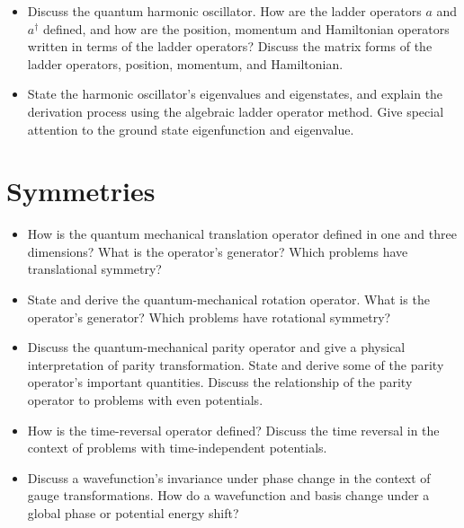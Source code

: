 \begin{itemize}

    \item Discuss the quantum harmonic oscillator. How are the ladder operators $ a $ and $ a^{\dagger} $ defined, and how are the position, momentum and Hamiltonian operators written in terms of the ladder operators? Discuss the matrix forms of the ladder operators, position, momentum, and Hamiltonian.

    \item State the harmonic oscillator's eigenvalues and eigenstates, and explain the derivation process using the algebraic ladder operator method. Give special attention to the ground state eigenfunction and eigenvalue.

\end{itemize}

\section{Symmetries}

\begin{itemize}

    \item How is the quantum mechanical translation operator defined in one and three dimensions? What is the operator's generator? Which problems have translational symmetry?

    \item State and derive the quantum-mechanical rotation operator. What is the operator's generator? Which problems have rotational symmetry?

    \item Discuss the quantum-mechanical parity operator and give a physical interpretation of parity transformation. State and derive some of the parity operator's important quantities. Discuss the relationship of the parity operator to problems with even potentials.

    \item How is the time-reversal operator defined? Discuss the time reversal in the context of problems with time-independent potentials.

    \item Discuss a wavefunction's invariance under phase change in the context of gauge transformations. How do a wavefunction and basis change under a global phase or potential energy shift?

\end{itemize}

